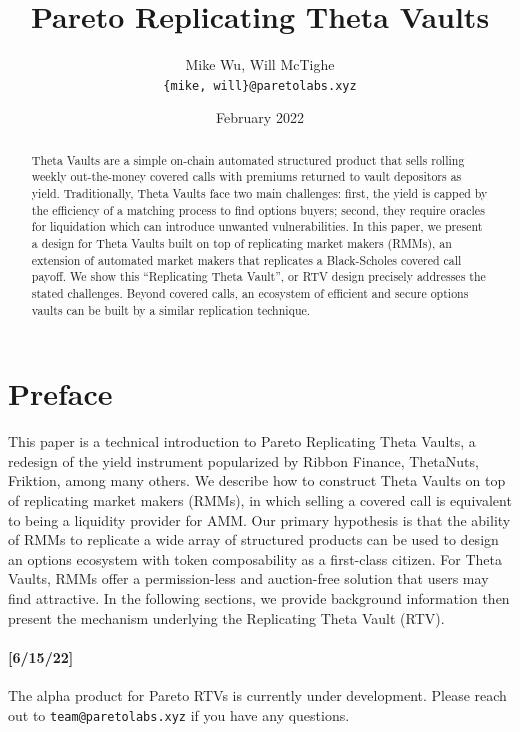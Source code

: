 \documentclass[hidelinks, 12pt]{article}
\title{Pareto Replicating Theta Vaults}
\author{Mike Wu, Will McTighe \\ \small\texttt{\{mike, will\}@paretolabs.xyz}}
\date{February 2022}
\begin{document}
\maketitle

\tableofcontents

\begin{abstract}
Theta Vaults are a simple on-chain automated structured product that sells rolling weekly out-the-money covered calls with premiums returned to vault depositors as yield.
Traditionally, Theta Vaults face two main challenges: first, the yield is capped by the efficiency of a matching process to find options buyers; second, they  require oracles for liquidation which can introduce unwanted vulnerabilities.
In this paper, we present a design for Theta Vaults built on top of replicating market makers (RMMs), an extension of automated market makers that replicates a Black-Scholes covered call payoff.
We show this ``Replicating Theta Vault'', or RTV design precisely addresses the stated challenges.
Beyond covered calls, an ecosystem of efficient and secure options vaults can be built by a similar replication technique.
\end{abstract}

\section{Preface}

This paper is a technical introduction to Pareto Replicating Theta Vaults, a redesign of the yield instrument popularized by Ribbon Finance, ThetaNuts, Friktion, among many others. We describe how to construct Theta Vaults on top of replicating market makers (RMMs), in which selling a covered call is equivalent to being a liquidity provider for AMM. Our primary hypothesis is that the ability of RMMs to replicate a wide array of structured products can be used to design an options ecosystem with token composability as a first-class citizen. For Theta Vaults, RMMs offer a permission-less and auction-free solution that users may find attractive. In the following sections, we provide background information then present the mechanism underlying the Replicating Theta Vault (RTV).

\paragraph{[6/15/22]} The alpha product for Pareto RTVs is currently under development. Please reach out to \texttt{team@paretolabs.xyz} if you have any questions.
\end{document}
